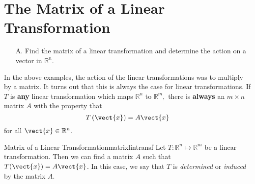 \section{The Matrix of a Linear \texorpdfstring{\\}{ } Transformation}

\begin{outcome}
\begin{enumerate}
\item[A.]  Find the matrix of a linear transformation and determine the action on a vector in $\mathbb{R}^n$.   
\end{enumerate}
\end{outcome}

In the above examples, the action of the linear transformations was to multiply by a matrix. 
It turns out that this is always the case for linear transformations.
If $T$ is \textbf{any} linear transformation which maps $\mathbb{R}^{n}$ to 
$\mathbb{R}^{m},$ there is \textbf{always} an $m\times n$ matrix $A$ with the
property that
\begin{equation}
T\left(\vect{x}\right) = A\vect{x} \label{matrixoftransf}
\end{equation}
for all $\vect{x} \in \mathbb{R}^{n}$.

\begin{theorem}{Matrix of a Linear Transformation}{matrixlintransf}
Let $T:\mathbb{R}^{n}\mapsto \mathbb{R}^{m}$ be a linear transformation. Then we can find a matrix $A$ such that $T(\vect{x}) = A\vect{x}$. 
 In this case, we say that $T$ is {\em determined\em} or {\em induced\em}
by the matrix $A$.
\end{theorem}


